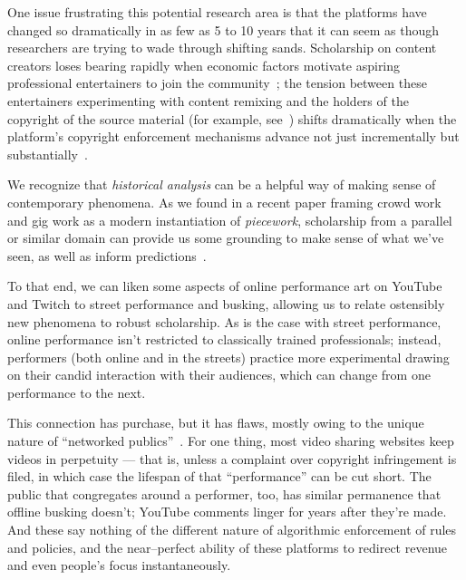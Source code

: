 \documentclass[10pt]{article}
\newcommand{\topic}[1]{{\color{Blue}#1}}
\begin{document}
\topic{One issue frustrating this potential research area is that
the platforms have changed so dramatically in as few as 5 to 10 years that
it can seem as though researchers are trying to wade through shifting sands.}
Scholarship on content creators loses bearing rapidly when economic factors motivate aspiring professional entertainers to join the community~\cite{Hamilton:2014:STF:2611105.2557048};
the tension between these entertainers experimenting with content remixing and
the holders of the copyright of the source material
(for example, see~\cite{Hilderbrand48})
shifts dramatically when
the platform's copyright enforcement mechanisms advance
not just incrementally but substantially~\cite{kim2012institutionalization}.

\topic{We recognize that \textit{historical analysis}
can be a helpful way of
making sense of contemporary phenomena.}
As we found in a recent paper framing crowd work and gig work as a modern instantiation of \textit{piecework},
scholarship from a parallel or similar domain can
provide us some grounding to make sense of what we've seen, as well as inform predictions~\cite{pieceworkCrowdworkGigwork}.

\topic{To that end, we can liken some aspects of online performance art on YouTube and Twitch
to street performance and busking,
allowing us to relate ostensibly new phenomena to robust scholarship.}
As is the case with street performance,
online performance isn't restricted to classically trained professionals;
instead, performers (both online and in the streets) practice more experimental 
drawing on their candid interaction with their audiences,
which can change from one performance to the next.

\topic{This connection has purchase, but it has flaws, mostly owing to the unique nature of ``networked publics''~\cite{boyd2007youth}.}
For one thing, most video sharing websites keep videos
in perpetuity
--- that is, unless a complaint over copyright infringement is filed, in which case the lifespan of that ``performance'' can be cut short.
The public that congregates around a performer, too, has similar permanence that offline busking doesn't;
YouTube comments linger for years after they're made.
And these say nothing of the different nature of algorithmic enforcement of rules and policies, and
the near--perfect ability of these platforms to redirect revenue and even people's focus instantaneously.
\end{document}
